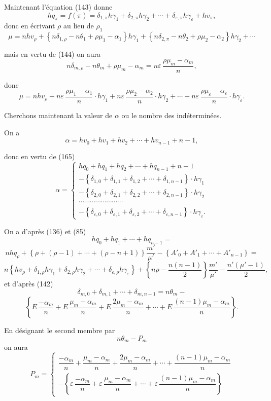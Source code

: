 \documentclass{article}
\begin{document}
Maintenant l'équation (143) donne
\[ hq_\pi = f(\pi) = \delta_{1,\pi}h\gamma_1+\delta_{2,\pi}h\gamma_2+\cdots+\delta_{\varepsilon,\pi}h\gamma_\varepsilon+hv_\pi, \tag{165} \]
donc en écrivant $\rho$ au lieu de $\rho_1$
\[ \mu = nhv_\rho+\left\{n\delta_{1,\rho}-n\theta_1+\rho\mu_1-\alpha_1\right\}h\gamma_1+\left\{n\delta_{2,\pi}-n\theta_2+\rho\mu_2-\alpha_2\right\}h\gamma_2+\cdots \]

mais en vertu de (144) on aura
\[ n\delta_{m,\rho} - n\theta_m + \rho\mu_m - \alpha_m = n\varepsilon\,\frac{\rho\mu_m-\alpha_m}{n}, \]

donc
\[ \mu = nhv_\rho+n\varepsilon\,\frac{\rho\mu_1-\alpha_1}{n} \cdot h\gamma_1+n\varepsilon\,\frac{\rho\mu_2-\alpha_2}{n} \cdot h\gamma_2+\cdots+n\varepsilon\,\frac{\rho\mu_\varepsilon-\alpha_\varepsilon}{n} \cdot h\gamma_\varepsilon. \tag{166} \]

Cherchons maintenant la valeur de $\alpha$ ou le nombre des indéterminées.

On a
\[ \alpha = hv_0+hv_1+hv_2+\cdots+hv_{n-1}+n-1, \]

donc en vertu de (165)
\[ \alpha = \begin{cases}
hq_0+hq_1+hq_2+\cdots+hq_{n-1}+n-1 \\
-\left\{\delta_{1,0}+\delta_{1,1}+\delta_{1,2}+\cdots+\delta_{1,n-1}\right\} \cdot h\gamma_1 \\
-\left\{\delta_{2,0}+\delta_{2,1}+\delta_{2,2}+\cdots+\delta_{2,n-1}\right\} \cdot h\gamma_2 \\
\cdots\cdots\cdots\cdots\cdots\cdots\cdots\cdots \\
-\left\{\delta_{\varepsilon,0}+\delta_{\varepsilon,1}+\delta_{\varepsilon,2}+\cdots+\delta_{\varepsilon,n-1}\right\} \cdot h\gamma_\varepsilon.
\end{cases} \tag{167} \]

On a d'après (136) et (85)
\[ hq_0+hq_1+\cdots+hq_{n-1} = \]
\[ nhq_\rho+\left\{\rho+(\rho-1)+\cdots+(\rho-n+1)\right\}\frac{m'}{\mu'}-\left\{A'_0+A'_1+\cdots+A'_{n-1}\right\} = \]
\[ n\left\{hv_\rho+\delta_{1,\rho}h\gamma_1+\delta_{2,\rho}h\gamma_2+\cdots+\delta_{\varepsilon,\rho}h\gamma_\varepsilon\right\} + \left\{n\rho-\frac{n(n-1)}{2}\right\}\frac{m'}{\mu'} - \frac{n'(\mu'-1)}{2}, \]
et d'après (142)
\[ \delta_{m,0}+\delta_{m,1}+\cdots+\delta_{m,n-1} = n\theta_m - \]
\[ \left\{ E\,\frac{-\alpha_m}{n} + E\,\frac{\mu_m-\alpha_m}{n} + E\,\frac{2\mu_m-\alpha_m}{n} + \cdots + E\,\frac{(n-1)\mu_m-\alpha_m}{n} \right\}. \tag{169} \]

En désignant le second membre par
\[ n\theta_m - P_m \]
on aura
\[ P_m = \begin{cases}
\dfrac{-\alpha_m}{n} + \dfrac{\mu_m-\alpha_m}{n} + \dfrac{2\mu_m-\alpha_m}{n} + \cdots + \dfrac{(n-1)\mu_m-\alpha_m}{n} \\[1mm]
-\left\{ \varepsilon\,\dfrac{-\alpha_m}{n} + \varepsilon\,\dfrac{\mu_m-\alpha_m}{n} + \cdots + \varepsilon\,\dfrac{(n-1)\mu_m-\alpha_m}{n} \right\}
\end{cases} \]
\end{document}
